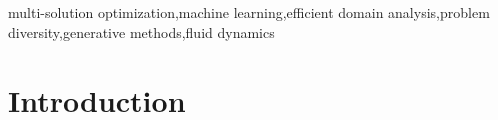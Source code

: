 \documentclass[times,final]{elsarticle}
\begin{document}
\begin{frontmatter}
\begin{abstract}
\end{abstract}

\begin{keyword}
	\KWD multi-solution optimization\sep machine learning\sep efficient domain analysis\sep problem diversity\sep generative methods\sep fluid dynamics
\end{keyword}

\end{frontmatter}

\section{Introduction}
\end{document}
